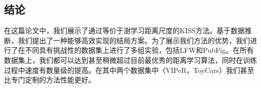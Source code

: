 \subsection{结论}

在这篇论文中，我们展示了通过等价于澍学习距离尺度的KISS方法。基于数据推断，我们提出了一种能够高效实现的结局方案。为了展示我们方法的优势，我们进行了在不同具有挑战性的数据集上进行了多组实验，包括LFW和PubFig。在所有数据集上，我们都可以达到甚至稍微超过目前最优秀的距离学习算法，同时在训练过程中速度有数量级的提高。在其中两个数据集中（VIPeR，ToyCars）我们甚至比专门定制的方法性能更好。
